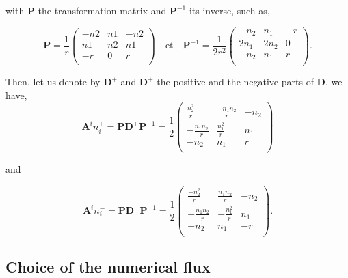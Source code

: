 \documentclass[a4paper,oneside,10pt]{report}
\begin{document}
with $\mathbf{P}$ the transformation matrix and $\mathbf{P}^{-1}$ its inverse, such as,

\begin{equation}
\mathbf{P}=\frac{1}{r}
\begin{pmatrix}
-n2 & n1 &-n2\\
n1 & n2 & n1\\
-r & 0 & r\\
\end{pmatrix}
\quad \mbox{et} \quad
\mathbf{P}^{-1}=\frac{1}{2r^2}
\begin{pmatrix}
-n_2 & n_1 & -r\\
2n_1 & 2n_2 & 0\\
-n_2 & n_1 & r\\
\end{pmatrix}.
\end{equation}

Then, let us denote by $\mathbf{D}^+$ and $\mathbf{D}^+$ the positive and the negative parts of $\mathbf{D}$, we have,
\begin{equation}
\mathbf{A}^in_i^+= \mathbf{P}\mathbf{D}^+\mathbf{P}^{-1} = \frac{1}{2}
\begin{pmatrix}
\frac{n_2^2}{r} & \frac{-n_1n_2}{r}  & -n_2 \\
-\frac{n_1n_2}{r}& \frac{n_1^2}{r} & n_1\\
-n_2& n_1 & r\\
\end{pmatrix}
\end{equation}

and

\begin{equation}
\mathbf{A}^in_i^-= \mathbf{P}\mathbf{D}^-\mathbf{P}^{-1} = \frac{1}{2}
\begin{pmatrix}
\frac{-n_2^2}{r} & \frac{n_1n_2}{r}  & -n_2 \\
-\frac{n_1n_2}{r}&  -\frac{n_1^2}{r} & n_1\\
-n_2& n_1 & -r\\
\end{pmatrix}.
\end{equation}



\subsection{Choice of the numerical flux}
\end{document}
